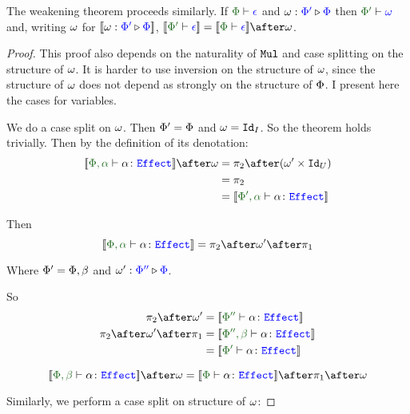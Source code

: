 \documentclass{Report}
\begin{document}
\begin{theorem}\label{EffWeakeningEff}
    The weakening theorem proceeds similarly. If $\wellformed{\P}{\e}$ and $\wrelw{\P'}{\P}$ then $\wellformed{\P'}{\w}$ and, writing $\w$ for $\deno{\wrelw{\P'}{\P}}$,  $\deno{\wellformed{\P'}{\e}} = \deno{\wellformed{\P}{\e}}\after\w$.

\end{theorem}

\begin{proof}
    This proof also depends on the naturality of $\Mul$ and case splitting on the structure of $\w$. It is harder to use inversion on the structure of $\w$, since the structure of $\w$ does not depend as strongly on the structure of $\P$. I present here the cases for variables.

    We do a case split on $\w$.
    \subcase{$\w = \i$}
    Then $\P' = \P$ and $\w = \Id{I}$. So the theorem holds trivially.
    Then by the definition of its denotation:    
    \begin{align*}
        \deno{\typerelation{\P,\a}{\a}{\effect}}\after\w &= \pp\after(\w'\times \Id{U}) \\
        & = \pp\\
        & = \deno{\typerelation{\P',\a}{\a}{\effect}}
    \end{align*}
    
    Then \begin{equation}
        \deno{\typerelation{\P,\a}{\a}{\effect}} = \pp\after\w'\after\p
    \end{equation}
    
    Where $\P' = \P,\b$ and $\wrel{\w'}{\P''}{\P}$.
    
    So\begin{align*}
        \pp\after\w' & = \deno{\typerelation{\P''}{\a}{\effect}}
        \\
        \pp\after\w'\after\p & =\deno{\typerelation{\P'',\b}{\a}{\effect}}\\
        &= \deno{\typerelation{\P'}{\a}{\effect}}
    \end{align*}
    
    \begin{equation}
        \deno{\typerelation{\P,\b}{\a}{\effect}}\after\w = \deno{\typerelation{\P}{\a}{\effect}}\after\p\after\w
    \end{equation}
    
    Similarly, we perform a case split on structure of $\w$:
    

\end{proof}
\end{document}
